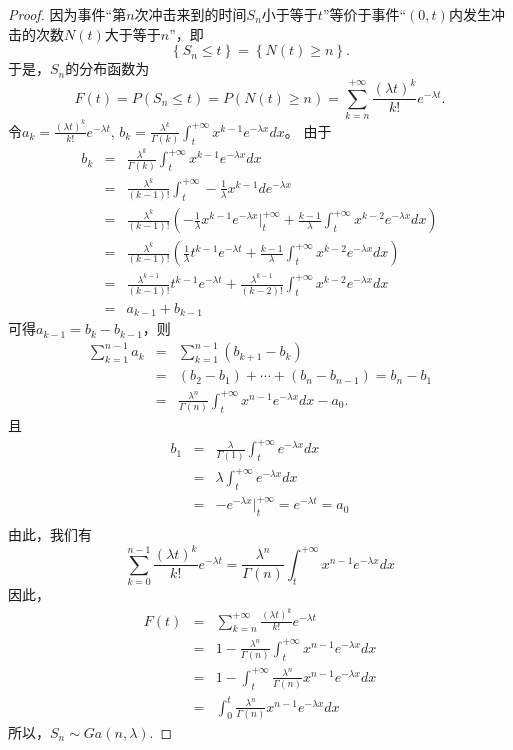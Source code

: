      \begin{proof}
    因为事件“第$n$次冲击来到的时间$S_{n}$小于等于$t$”等价于事件“$(0,t)$内发生冲击的次数$N(t)$大于等于$n$”，即$$\left \{ S_{n} \le t \right \} =\left \{ N(t)\ge n \right \}. $$
    于是，$S_{n}$的分布函数为$$F(t)=P(S_{n}\le t )=P(N(t)\ge n)=\sum_{k=n}^{+\infty } \frac{(\lambda t)^{k} }{k!} e^{-\lambda t}.$$
    令$a_{k} = \frac{(\lambda t)^{k} }{k!} e^{-\lambda t}$, $ b_{k} = \frac{\lambda ^{k} }{\Gamma (k)}\int_{t}^{+\infty }x^{k-1}e^{-\lambda x}dx $。
    由于
    \begin{eqnarray*}
         b_{k}
       &=&\frac{\lambda ^{k} }{\Gamma (k)}\int_{t}^{+\infty }x^{k-1}e^{-\lambda x}dx \\
       &=&\frac{\lambda ^{k} }{(k-1)!}\int_{t}^{+\infty }-\frac{1}{\lambda } x^{k-1}d e^{-\lambda x}  \\
       &=&\frac{\lambda ^{k} }{(k-1)!}(-\frac{1}{\lambda } x^{k-1}e^{-\lambda x} |_{t}^{+\infty } +\frac{k-1}{\lambda }\int_{t}^{+\infty }x^{k-2} e^{-\lambda x}dx   )\\
       &=&\frac{\lambda ^{k} }{(k-1)!}(\frac{1}{\lambda } t^{k-1}e^{-\lambda t}  +\frac{k-1}{\lambda }\int_{t}^{+\infty }x^{k-2} e^{-\lambda x}dx   )\\
       &=&\frac{\lambda ^{k-1} }{(k-1)!} t^{k-1}e^{-\lambda t}  +\frac{\lambda ^{k-1} }{(k-2)!}\int_{t}^{+\infty }x^{k-2} e^{-\lambda x}dx  \\
       &=&a_{k-1} +b_{k-1}
    \end{eqnarray*}
    可得$a_{k-1} =b_{k}-b_{k-1}$，则
    \begin{eqnarray*}
        \sum_{k=1}^{n-1} a_{k} &=&\sum_{k=1}^{n-1}(b_{k+1}-b_{k})\\
        &=&(b_{2}-b_{1})+\cdots +(b_{n}-b_{n-1})=b_{n}-b_{1}\\
        &=&\frac{\lambda ^{n} }{\Gamma (n)}\int_{t}^{+\infty } x^{n-1}e^{-\lambda x} dx-a_{0} .
    \end{eqnarray*}  且
    \begin{eqnarray*}
        b_{1} &=&\frac{\lambda  }{\Gamma (1)}\int_{t}^{+\infty } e^{-\lambda x} dx\\
        &=&\lambda \int_{t}^{+\infty } e^{-\lambda x} dx\\
        &=&-e^{-\lambda x}|_{t}^{+\infty }=e^{-\lambda t}=a_{0} \\
         \end{eqnarray*}
    由此，我们有
    $$\sum_{k=0}^{n-1 } \frac{(\lambda t)^{k} }{k!} e^{-\lambda t}= \frac{\lambda ^{n} }{\Gamma (n)}\int_{t}^{+\infty } x^{n-1}e^{-\lambda x} dx
   $$
    因此，
    \begin{eqnarray*}
       F(t)
       &=&\sum_{k=n}^{+\infty } \frac{(\lambda t)^{k} }{k!} e^{-\lambda t}\\
       &=&1-\frac{\lambda ^{n} }{\Gamma (n)}\int_{t}^{+\infty }  x^{n-1} e^{-\lambda x} dx\\
       &=&1-\int_{t}^{+\infty }  \frac{\lambda ^{n} }{\Gamma (n)}x^{n-1} e^{-\lambda x} dx\\
       &=&\int_{0}^{t}  \frac{\lambda ^{n} }{\Gamma (n)}x^{n-1} e^{-\lambda x} dx
    \end{eqnarray*}
    所以，$S_{n}\sim Ga(n,\lambda)$.
    \end{proof}
